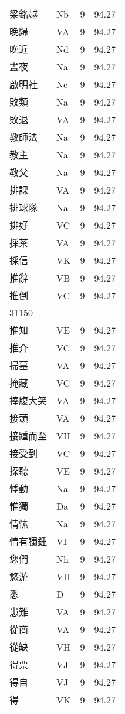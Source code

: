 \documentclass[twocolumn]{book}
\begin{document}
\begin{supertabular}{llrr}
梁銘越 & Nb & 9 &  94.27\\
晚歸 & VA & 9 &  94.27\\
晚近 & Nd & 9 &  94.27\\
晝夜 & Na & 9 &  94.27\\
啟明社 & Nc & 9 &  94.27\\
敗類 & Na & 9 &  94.27\\
敗退 & VA & 9 &  94.27\\
教師法 & Na & 9 &  94.27\\
教主 & Na & 9 &  94.27\\
教父 & Na & 9 &  94.27\\
排課 & VA & 9 &  94.27\\
排球隊 & Na & 9 &  94.27\\
排好 & VC & 9 &  94.27\\
採茶 & VA & 9 &  94.27\\
採信 & VK & 9 &  94.27\\
推辭 & VB & 9 &  94.27\\
推倒 & VC & 9 &  94.27\\
31150\\
推知 & VE & 9 &  94.27\\
推介 & VC & 9 &  94.27\\
掃墓 & VA & 9 &  94.27\\
掩藏 & VC & 9 &  94.27\\
捧腹大笑 & VA & 9 &  94.27\\
接頭 & VA & 9 &  94.27\\
接踵而至 & VH & 9 &  94.27\\
接受到 & VC & 9 &  94.27\\
探聽 & VE & 9 &  94.27\\
悸動 & Na & 9 &  94.27\\
惟獨 & Da & 9 &  94.27\\
情愫 & Na & 9 &  94.27\\
情有獨鍾 & VI & 9 &  94.27\\
您們 & Nh & 9 &  94.27\\
悠游 & VH & 9 &  94.27\\
悉 & D & 9 &  94.27\\
患難 & VA & 9 &  94.27\\
從商 & VA & 9 &  94.27\\
從缺 & VH & 9 &  94.27\\
得票 & VJ & 9 &  94.27\\
得自 & VJ & 9 &  94.27\\
得 & VK & 9 &  94.27\\

\end{supertabular}
\end{document}
